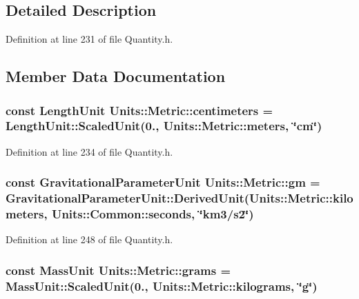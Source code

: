 \subsection{Detailed Description}


Definition at line 231 of file Quantity.\+h.



\subsection{Member Data Documentation}
\hypertarget{class_units_1_1_metric_a74dbbff37b76b1265ad6ca64168798b0}{
\subsubsection[{centimeters}]{\setlength{\rightskip}{0pt plus 5cm}const {\bf Length\+Unit} Units\+::\+Metric\+::centimeters = {\bf Length\+Unit\+::\+Scaled\+Unit}(0., {\bf Units\+::\+Metric\+::meters}, \char`\"{}cm\char`\"{})\hspace{0.3cm}{\ttfamily [static]}}}\label{class_units_1_1_metric_a74dbbff37b76b1265ad6ca64168798b0}


Definition at line 234 of file Quantity.\+h.

\hypertarget{class_units_1_1_metric_a8e5b74eb410af1d26aadb0adfb77dc21}{
\subsubsection[{gm}]{\setlength{\rightskip}{0pt plus 5cm}const {\bf Gravitational\+Parameter\+Unit} Units\+::\+Metric\+::gm = {\bf Gravitational\+Parameter\+Unit\+::\+Derived\+Unit}({\bf Units\+::\+Metric\+::kilometers}, {\bf Units\+::\+Common\+::seconds}, \char`\"{}km3/s2\char`\"{})\hspace{0.3cm}{\ttfamily [static]}}}\label{class_units_1_1_metric_a8e5b74eb410af1d26aadb0adfb77dc21}


Definition at line 248 of file Quantity.\+h.

\hypertarget{class_units_1_1_metric_a88cdf60341e6f6d7013018cdc1c26ec6}{
\subsubsection[{grams}]{\setlength{\rightskip}{0pt plus 5cm}const {\bf Mass\+Unit} Units\+::\+Metric\+::grams = {\bf Mass\+Unit\+::\+Scaled\+Unit}(0., {\bf Units\+::\+Metric\+::kilograms}, \char`\"{}g\char`\"{})\hspace{0.3cm}{\ttfamily [static]}}}\label{class_units_1_1_metric_a88cdf60341e6f6d7013018cdc1c26ec6}


